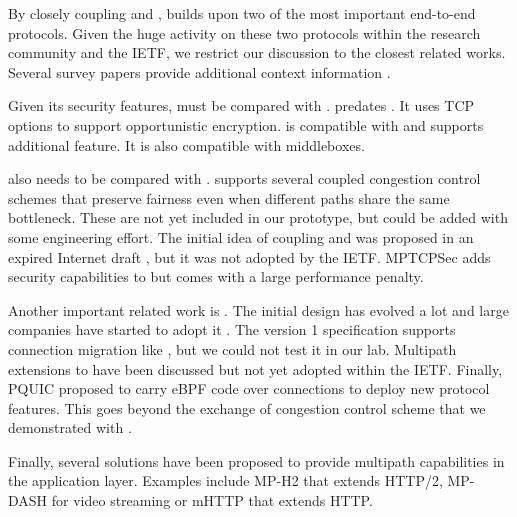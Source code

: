 
By closely coupling \tcp and \tls, \tcpls builds upon two of the most important end-to-end protocols. Given the huge activity on these two protocols within the research community and the IETF, we restrict our discussion to the closest
related works. Several survey papers provide additional context information \cite{polese2019survey,li2016multipath,papastergiou2016ossifying}.

Given its security features, \tcpls must be compared with \tcpcrypt \cite{bittau2010case,rfc8548}. \tcpcrypt predates . It uses TCP options to support opportunistic encryption. \tcpls is compatible with \tls and supports additional feature. It is also compatible with \tcp middleboxes.

\tcpls also needs to be compared with \mptcp \cite{raiciu2012hard,rfc6824}. \mptcp supports several coupled congestion control schemes \cite{peng2014multipath,wischik2011design,khalili2013mptcp} that preserve fairness even when different paths share the same bottleneck. These are not yet included in our \tcpls prototype, but could be added with some engineering effort. The initial idea of coupling \mptcp and \tls was proposed in an expired Internet draft \cite{draft-paasch-mptcp-ssl-00}, but it was not adopted by the IETF. MPTCPSec \cite{jadin2017securing} adds security capabilities to \mptcp but comes with a large performance penalty.

Another important related work is \quic. The initial design \cite{roskind2013quic} has evolved a lot and large companies have started to adopt it \cite{10.1145/3098822.3098842,Joras_mvfst,marx2020same}. The \quic version 1 specification \cite{draft-ietf-quic-transport} supports connection migration like \tcpls, but we could not test it in our lab. Multipath extensions \cite{viernickel2018multipath,de2017multipath,draft-deconinck-quic-multipath-06,draft-liu-multipath-quic-02} to \quic have been discussed but not yet adopted within the IETF. Finally, PQUIC \cite{de2019pluginizing} proposed to carry eBPF code over \quic connections to deploy new protocol features. This goes beyond the exchange of congestion control scheme that we demonstrated with \tcpls.

Finally, several solutions have been proposed to provide multipath capabilities in the application layer. Examples include MP-H2 \cite{nikravesh2019mp} that extends HTTP/2, MP-DASH \cite{han2016mp} for video streaming or mHTTP \cite{kim2014multi} that extends HTTP.


